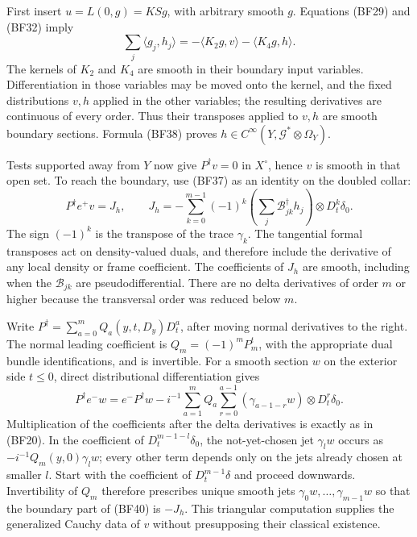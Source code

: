 \documentclass[
  11pt,
]{article}
\begin{document}
First insert \(u=L(0,g)=KSg\), with arbitrary smooth \(g\). Equations
(BF29) and (BF32) imply \[
 \sum_j\langle g_j,h_j\rangle
 =-\langle K_2g,v\rangle-\langle K_4g,h\rangle.
 \tag{BF38}
\] The kernels of \(K_2\) and \(K_4\) are smooth in their boundary input
variables. Differentiation in those variables may be moved onto the
kernel, and the fixed distributions \(v,h\) applied in the other
variables; the resulting derivatives are continuous of every order. Thus
their transposes applied to \(v,h\) are smooth boundary sections.
Formula (BF38) proves \(h\in C^\infty(Y,\mathcal G^*\otimes\Omega_Y)\).

Tests supported away from \(Y\) now give \(P^\dagger v=0\) in
\(X^\circ\), hence \(v\) is smooth in that open set. To reach the
boundary, use (BF37) as an identity on the doubled collar: \[
 P^\dagger e^+v=J_h,
 \qquad
 J_h=-\sum_{k=0}^{m-1}(-1)^k
       \left(\sum_j\mathcal B_{jk}^\dagger h_j\right)
                   \otimes D_t^k\delta_0.
 \tag{BF39}
\] The sign \((-1)^k\) is the transpose of the trace \(\gamma_k\). The
tangential formal transposes act on density-valued duals, and therefore
include the derivative of any local density or frame coefficient. The
coefficients of \(J_h\) are smooth, including when the
\(\mathcal B_{jk}\) are pseudodifferential. There are no delta
derivatives of order \(m\) or higher because the transversal order was
reduced below \(m\).

Write \(P^\dagger=\sum_{a=0}^mQ_a(y,t,D_y)D_t^a\), after moving normal
derivatives to the right. The normal leading coefficient is
\(Q_m=(-1)^mP_m^t\), with the appropriate dual bundle identifications,
and is invertible. For a smooth section \(w\) on the exterior side
\(t\leq0\), direct distributional differentiation gives \[
 P^\dagger e^-w=e^-P^\dagger w
 -i^{-1}\sum_{a=1}^m Q_a\sum_{r=0}^{a-1}
                    (\gamma_{a-1-r}w)\otimes D_t^r\delta_0.
 \tag{BF40}
\] Multiplication of the coefficients after the delta derivatives is
exactly as in (BF20). In the coefficient of \(D_t^{m-1-l}\delta_0\), the
not-yet-chosen jet \(\gamma_lw\) occurs as \(-i^{-1}Q_m(y,0)\gamma_lw\);
every other term depends only on the jets already chosen at smaller
\(l\). Start with the coefficient of \(D_t^{m-1}\delta\) and proceed
downwards. Invertibility of \(Q_m\) therefore prescribes unique smooth
jets \(\gamma_0w,\ldots,\gamma_{m-1}w\) so that the boundary part of
(BF40) is \(-J_h\). This triangular computation supplies the generalized
Cauchy data of \(v\) without presupposing their classical existence.
\end{document}
